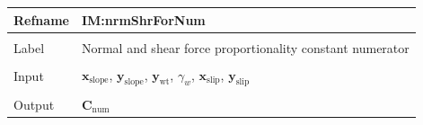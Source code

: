 \documentclass[12pt]{article}
\begin{document}
\vspace{\baselineskip}
\noindent
\begin{minipage}{\textwidth}
\begin{tabular}{>{\raggedright}p{}>{\raggedright\arraybackslash}p{}}
\toprule \textbf{Refname} & \textbf{IM:nrmShrForNum}
\label{IM:nrmShrForNum}
\\ \midrule \\
Label & Normal and shear force proportionality constant numerator
        
\\ \midrule \\
Input & ${\mathbf{x}_{\text{slope}}}$, ${\mathbf{y}_{\text{slope}}}$, ${\mathbf{y}_{\text{wt}}}$, ${γ_{w}}$, ${\mathbf{x}_{\text{slip}}}$, ${\mathbf{y}_{\text{slip}}}$
        
\\ \midrule \\
Output & ${\mathbf{C}_{\text{num}}}$
         

\end{tabular}
\end{minipage}
\end{document}
